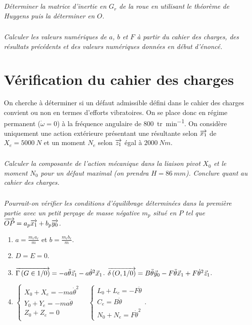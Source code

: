 \documentclass[10pt,fleqn]{article} %
\begin{document}
\begin{multicols}{2}
\subparagraph{}
\textit{Déterminer la matrice d'inertie en $G_r$ de la roue en utilisant le théorème de Huygens puis la déterminer en $O$.}

\subparagraph{}
\textit{Calculer les valeurs numériques de $a$, $b$ et $F$ à partir du cahier des charges, des résultats précédents et des valeurs numériques données en début d'énoncé.}


\section*{Vérification du cahier des charges}

On cherche à déterminer si un défaut admissible défini dans le cahier des charges convient ou non en termes d'efforts vibratoires.
On se place donc en régime permanent ($\dot{\omega}=0$) à la fréquence angulaire de \SI{800}{tr.min^{-1}}. On considère uniquement une action extérieure présentant une résultante selon $\overrightarrow{x_1}$ de $X_e=\SI{5000}{N}$ et un moment $N_e$ selon $\overrightarrow{z_1}$ égal à $\SI{2000}{Nm}$.


\subparagraph{}
\textit{Calculer la composante de l'action mécanique dans la liaison pivot $X_0$ et le moment $N_0$ pour un défaut maximal (on prendra $H=\SI{86}{mm}$). Conclure quant au cahier des charges.}


\subparagraph{}
\textit{Pourrait-on vérifier les conditions d'équilibrage déterminées dans la première partie avec un petit perçage de masse négative $m_p$ situé en $P$ tel que $\overrightarrow{OP} = a_p \overrightarrow{x_1} + b_p \overrightarrow{y_0}$.}


\vspace{2cm}

\footnotesize
\begin{enumerate}
\item $a=\frac{m_r a_r}{m}$ et $b=\frac{m_r b_r}{m}$.
\item $D=E=0$.
\item $\overrightarrow{\Gamma \left( {G} \in {1}/{0}\right)}=-a\ddot{\theta} \vec{z}_1-a\dot{\theta}^2\vec{x}_1$. $\overrightarrow{\delta \left( {O}, {1} /{0}\right)}=B \ddot{\theta}\vec{y}_0 - F \ddot{\theta} \vec{x}_1 + F \dot{\theta}^2 \vec{z}_1$.


\item $
\left\{ \begin{array}{l}
X_0 + X_e = - m a \dot{\theta}^2 \\
Y_0 + Y_e = - m a \ddot{\theta} \\
Z_0 + Z_e = 0 \\
\end{array}
\right.
\quad
\left\{ \begin{array}{l}
L_0 +L_e = -F \ddot{\theta} \\
C_e = B \ddot{\theta} \\
N_0 +N_e= F \dot{\theta}^2
\end{array}
\right. .
$


\end{enumerate}
\end{multicols}
\end{document}
